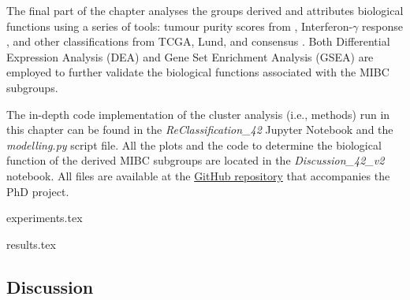 The final part of the chapter analyses the groups derived and attributes biological functions using a series of tools: tumour purity scores from \citet{Yoshihara2013-wq}, Interferon-$\gamma$ response \citet{Baker2022-bj}, and other classifications from TCGA, Lund, and consensus \citet{Robertson2017-mg,Marzouka2018-ge,Kamoun2020-tj}. Both Differential Expression Analysis (DEA) and Gene Set Enrichment Analysis (GSEA) are employed to further validate the biological functions associated with the MIBC subgroups.

The in-depth code implementation of the cluster analysis (i.e., methods) run in this chapter can be found in the \textit{ReClassification\_42} Jupyter Notebook and the \textit{modelling.py} script file. All the plots and the code to determine the biological function of the derived MIBC subgroups are located in the \textit{Discussion\_42\_v2} notebook. All files are available at the \href{https://github.com/vladUng/Phd_thesis_exp}{GitHub repository} that accompanies the PhD project.



{experiments.tex}

{results.tex}

\subsection{Discussion}
